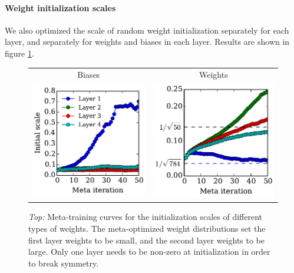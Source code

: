 \documentclass{article}
\begin{document}
\paragraph{Weight initialization scales}
We also optimized the scale of random weight initialization separately for each layer, and separately for weights and biases in each layer.
Results are shown in figure \ref{fig:nn weight init scales}.

\begin{figure}[h!]
\vskip 0.2in
\begin{center}
\begin{tabular}{cc}
 Biases & Weights \\
\hspace{-1em}\includegraphics[width=0.5\columnwidth, height=0.5\columnwidth]{../experiments/Feb_3_training_schedules/3_adam_50/init_bias_learning_curve.pdf} &
\hspace{-1em}\includegraphics[width=0.5\columnwidth, height=0.5\columnwidth]{../experiments/Feb_3_training_schedules/3_adam_50/init_weight_learning_curve.pdf}
\end{tabular}
\caption{\emph{Top:} Meta-training curves for the initialization scales of different types of weights.
The meta-optimized weight distributions set the first layer weights to be small, and the second layer weights to be large.
Only one layer needs to be non-zero at initialization in order to break symmetry.}
\label{fig:nn weight init scales}
\end{center}
\vskip -0.2in
\end{figure} 
\end{document}
